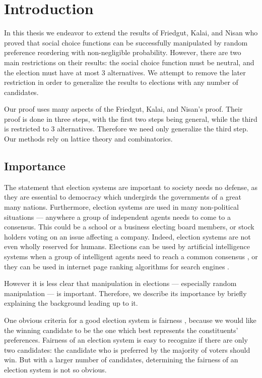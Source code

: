 

\chapter{Introduction}

	In this thesis we endeavor to extend the results of Friedgut, Kalai, and Nisan \cite{friedgut2008elections} who proved that social choice functions can be successfully manipulated by random preference reordering with non-negligible probability. However, there are two main restrictions on their results: the social choice function must be neutral, and the election must have at most 3 alternatives. We attempt to remove the later restriction in order to generalize the results to elections with any number of candidates.

	Our proof uses many aspects of the Friedgut, Kalai, and Nisan's proof. Their proof is done in three steps, with the first two steps being general, while the third is restricted to 3 alternatives. Therefore we need only generalize the third step. Our methods rely on lattice theory and combinatorics.


\section{Importance}

	The statement that election systems are important to society needs no defense, as they are essential to democracy which undergirds the governments of a great many nations. Furthermore, election systems are used in many non-political situations --- anywhere a group of independent agents needs to come to a consensus. This could be a school or a business electing board members, or stock holders voting on an issue affecting a company. Indeed, election systems are not even wholly reserved for humans. Elections can be used by artificial intelligence systems when a group of intelligent agents need to reach a common consensus \cite{ephrati1991clarke, ephrati1993multi, pennock2000social, dwork2001rank, fagin2003efficient}, or they can be used in internet page ranking algorithms for search engines \cite{chevaleyre2007short}.

	However it is less clear that manipulation in elections --- especially random manipulation --- is important. Therefore, we describe its importance by briefly explaining the background leading up to it.

	One obvious criteria for a good election system is fairness \cite{chevaleyre2006issues}, because we would like the winning candidate to be the one which best represents the constituents' preferences. Fairness of an election system is easy to recognize if there are only two candidates: the candidate who is preferred by the majority of voters should win. But with a larger number of candidates, determining the fairness of an election system is not so obvious.


